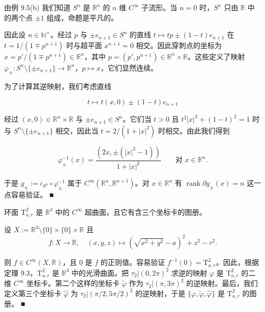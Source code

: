\begin{example}
\proofhead
由例 9.5(b) 我们知道 $ S^{n} $ 是 $ \mathbb{R}^{n} $ 的 $ n $ 维 $ C^{\infty} $ 子流形。当 $ n = 0 $ 时，$ S^{n} $ 只由 $ \mathbb{R} $ 中的两个点 $ \pm 1 $ 组成，命题是平凡的。

因此设 $ n \in \mathbb{N}^{\times} $。经过 $ p $ 与 $ \pm e_{n+1} \in S^{n} $ 的直线 $ t \mapsto tp \pm (1 - t)e_{n+1} $ 在 $ t = 1/(1 \mp p^{n+1}) $ 时与超平面 $ x^{n+1} = 0 $ 相交。因此穿刺点的坐标为 $ x = p'/(1 \mp p^{n+1}) \in \mathbb{R}^{n} $，其中 $ p = (p', p^{n+1}) \in \mathbb{R}^{n} \times \mathbb{R} $。这些定义了映射 $ \varphi_{\pm} : S^{n}\setminus\{\pm e_{n+1}\} \to \mathbb{R}^{n} $，$ p \mapsto x $，它们显然连续。

为了计算其逆映射，我们考虑直线

\[
t \mapsto t(x, 0) \pm (1 - t)e_{n+1}
\]

经过 $ (x, 0) \in \mathbb{R}^{n} \times \mathbb{R} $ 与 $ \pm e_{n+1} \in S^{n} $。它们当 $ t > 0 $ 且 $ t^{2}|x|^{2} + (1 - t)^{2} = 1 $ 时与 $ S^{n}\setminus\{\pm e_{n+1}\} $ 相交，因此当 $ t = 2/(1 + |x|^{2}) $ 时相交。由此我们得到

\[
\varphi_{\pm}^{-1}(x) = \frac{(2x, \pm(|x|^{2} - 1))}{1 + |x|^{2}} \qquad \text{对 } x \in \mathbb{R}^{n} .
\]

于是 $ g_{\pm} := i_{S^{n}} \circ \varphi_{\pm}^{-1} $ 属于 $ C^{\infty}(\mathbb{R}^{n}, \mathbb{R}^{n+1}) $。对 $ x \in \mathbb{R}^{n} $ 有 $ \operatorname{rank}\partial g_{\pm}(x) = n $ 这一点容易验证。 \nobreak\hspace{0.35em}■

\begin{items}
\item[（e）]

环面 $ \mathrm{T}^{2}_{a,r} $ 是 $ \mathbb{R}^{3} $ 中的 $ C^{\infty} $ 超曲面，且它有含三个坐标卡的图册。

\proofhead
设 $ X := \mathbb{R}^{3}\setminus\{0\} \times \{0\} \times \mathbb{R} $ 且
\[
f : X \to \mathbb{R} , \quad (x, y, z) \mapsto \left(\sqrt{x^{2} + y^{2}} - a\right)^{2} + z^{2} - r^{2} .
\]

则 $ f \in C^{\infty}(X, \mathbb{R}) $，且 0 是 $ f $ 的正则值。容易验证 $ f^{-1}(0) = \mathrm{T}^{2}_{a,r} $。因此，根据定理 9.3，$ \mathrm{T}^{2}_{a,r} $ 是 $ \mathbb{R}^{3} $ 中的光滑曲面。把
$ \tau_{2}|(0, 2\pi)^{2} $ 求逆的映射 $ \varphi $ 是 $ \mathrm{T}^{2}_{a,r} $ 的二维 $ C^{\infty} $ 坐标卡。第二个这样的坐标卡 $ \tilde{\varphi} $ 作为 $ \tau_{2}|(\pi, 3\pi)^{2} $ 的逆映射。最后，我们定义第三个坐标卡 $ \hat{\varphi} $ 为 $ \tau_{2}|(\pi/2, 5\pi/2)^{2} $ 的逆映射，于是 $ \{\varphi, \tilde{\varphi}, \hat{\varphi}\} $ 是 $ \mathrm{T}^{2}_{a,r} $ 的图册。 \nobreak\hspace{0.35em}■

\end{items}

\end{example}

